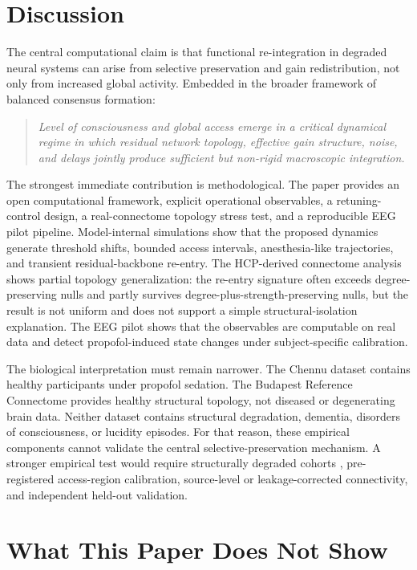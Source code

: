 \documentclass[11pt,a4paper]{article}
\theoremstyle{plain}
\theoremstyle{definition}
\theoremstyle{remark}
\begin{document}
\section{Discussion}
\label{sec:diskussion}

The central computational claim is that functional re-integration in degraded neural systems can arise from selective preservation and gain redistribution, not only from increased global activity. Embedded in the broader framework of balanced consensus formation:

\begin{quote}
\itshape
Level of consciousness and global access emerge in a critical dynamical regime in which residual network topology, effective gain structure, noise, and delays jointly produce sufficient but non-rigid macroscopic integration.
\end{quote}

The strongest immediate contribution is methodological. The paper provides an open computational framework, explicit operational observables, a retuning-control design, a real-connectome topology stress test, and a reproducible EEG pilot pipeline. Model-internal simulations show that the proposed dynamics generate threshold shifts, bounded access intervals, anesthesia-like trajectories, and transient residual-backbone re-entry. The HCP-derived connectome analysis shows partial topology generalization: the re-entry signature often exceeds degree-preserving nulls and partly survives degree-plus-strength-preserving nulls, but the result is not uniform and does not support a simple structural-isolation explanation. The EEG pilot shows that the observables are computable on real data and detect propofol-induced state changes under subject-specific calibration.

The biological interpretation must remain narrower. The Chennu dataset contains healthy participants under propofol sedation. The Budapest Reference Connectome provides healthy structural topology, not diseased or degenerating brain data. Neither dataset contains structural degradation, dementia, disorders of consciousness, or lucidity episodes. For that reason, these empirical components cannot validate the central selective-preservation mechanism. A stronger empirical test would require structurally degraded cohorts \citep{laureys2004,giacino2014,naccache2018}, pre-registered access-region calibration, source-level or leakage-corrected connectivity, and independent held-out validation.

\section{What This Paper Does Not Show}
\label{sec:not-show}
\end{document}
